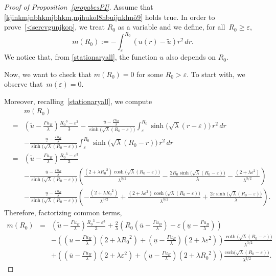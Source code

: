 \documentclass[12pt,a4paper,intlimits,sumlimits]{amsart}
\theoremstyle{definition}
\theoremstyle{plain}
\numberwithin{equation}{section}
\renewcommand{\ge}{\geqslant}
\begin{document}
\begin{proof}[Proof of Proposition~\ref{propabcsPI}]
Assume that \eqref{kjinkmjnbhkmjbhkm,mjhukol8hbuijnklmò9} holds true.
In order to prove~\eqref{<sercvgunjkop}, we treat $R_0$ as a variable and we define, for all~$R_0\ge\varepsilon$,
\[
m(R_0):=-\int_\varepsilon^{R_0}(u(r)-\widetilde u)r^2\,dr.
\]
We notice that, from \eqref{stationaryall}, the function $u$ also depends on $R_0$.

Now, we want to check that $m(R_0)=0$ for some $R_0>\varepsilon$. To start with, we observe that~$m(\varepsilon)=0$.

Moreover, recalling~\eqref{stationaryall}, we compute
\begin{eqnarray*}
&&m(R_0)\\&=&\left(\widetilde u-\frac{\Gamma u_B}\lambda\right)
\frac{{R_0}^3-\varepsilon^3}{3}
-\frac{\overline{u}-\frac{\Gamma u_B}{\lambda}}{\sinh\big(\sqrt{\lambda}(R_0-\varepsilon)\big)}\int_\varepsilon^{R_0}
\sinh\big(\sqrt{\lambda}(r-\varepsilon)\big) \,r^2\,dr\\&&
-
\frac{\underline{u}-\frac{\Gamma u_B}{\lambda}}{\sinh\big(\sqrt{\lambda}(R_0-\varepsilon)\big)}\int_\varepsilon^{R_0}
\sinh\big(\sqrt{\lambda}(R_0-r)\big)\,r^2\,dr\\
&=&
\left(\widetilde u-\frac{\Gamma u_B}\lambda\right)
\frac{{R_0}^3-\varepsilon^3}{3}
\\&&-\frac{\overline{u}-\frac{\Gamma u_B}{\lambda}}{\sinh\big(\sqrt{\lambda}(R_0-\varepsilon)\big)}
\left(
\frac{(2 + \lambda {R_0}^2) \cosh\big(\sqrt\lambda (R_0-\varepsilon )\big)}{\lambda^{3/2}} - \frac{2 R_0\sinh\big(\sqrt\lambda (R_0-\varepsilon)\big)}{\lambda}
-
\frac{(2 + \lambda \varepsilon^2) }{\lambda^{3/2}}\right)
\\&&
-
\frac{\underline{u}-\frac{\Gamma u_B}{\lambda}}{\sinh\big(\sqrt{\lambda}(R_0-\varepsilon)\big)}
\left( -\frac{(2 + \lambda {R_0}^2) }{\lambda^{3/2}} 
+\frac{(2 + \lambda \varepsilon^2) \cosh\big(\sqrt\lambda ( R_0-\varepsilon)\big)}{\lambda^{3/2}} 
+ \frac{2 \varepsilon \sinh\big(\sqrt\lambda (R_0-\varepsilon)\big)}{\lambda}
\right).
\end{eqnarray*}
Therefore, factorizing common terms,
\begin{eqnarray*}
m(R_0)&=&
\left(\widetilde u-\frac{\Gamma u_B}\lambda\right)
\frac{{R_0}^3-\varepsilon^3}{3}+\frac2{\lambda}\left(
R_0\left(\overline{u}-\frac{\Gamma u_B}{\lambda}\right)
-\varepsilon\left(\underline{u}-\frac{\Gamma u_B}{\lambda}
\right)\right)
\\&&
-\left(
\left(\overline{u}-\frac{\Gamma u_B}{\lambda}\right)
(2 + \lambda {R_0}^2) 
+\left(\underline{u}-\frac{\Gamma u_B}{\lambda}
\right)(2 + \lambda \varepsilon^2) \right)
\frac{\coth\big(\sqrt\lambda (R_0-\varepsilon )\big)}{\lambda^{3/2}}
\\&&+
\left(
\left(\overline{u}-\frac{\Gamma u_B}{\lambda}\right)(2 + \lambda \varepsilon^2) 
+
\left(\underline{u}-\frac{\Gamma u_B}{\lambda}\right)
(2 + \lambda {R_0}^2) \right)
\frac{\text{csch}\big(\sqrt{\lambda}(R_0-\varepsilon)\big)}{\lambda^{3/2}}
.
\end{eqnarray*}


\end{proof}
\end{document}
